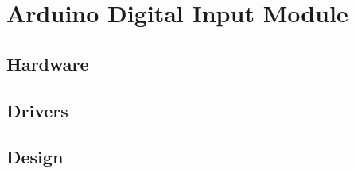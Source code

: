 

\section{Arduino Digital Input Module}
\label{sec:arduino}
\subsection{Hardware}


\subsection{ Drivers}


\subsection {Design}






